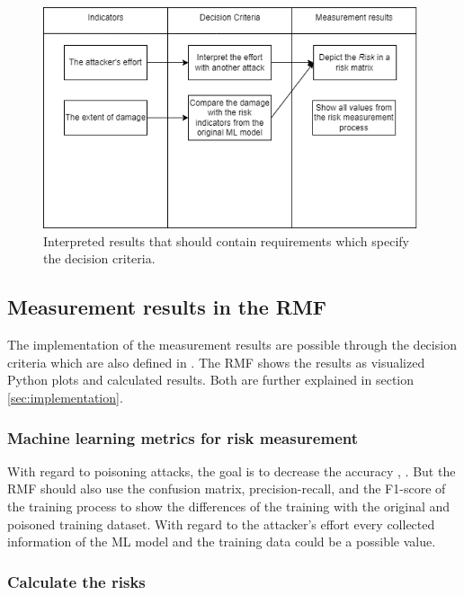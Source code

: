 \begin{figure}[ht!]
  \centering
  \includegraphics[width=11cm]{pictures/measurement_results_concept.png}
  \caption{Interpreted results that should contain requirements which specify the decision criteria.}
  \label{fig:measurement_results_concept}
\end{figure}

\subsection{Measurement results in the RMF}
\label{sec:measurement_results}

The implementation of the measurement results are possible through the decision criteria which are also defined in \cite{ISO_27004_2009}. The RMF shows the results as visualized Python plots and calculated results. Both are further explained in section \ref{sec:implementation}.

\subsubsection*{Machine learning metrics for risk measurement}

With regard to poisoning attacks, the goal is to decrease the accuracy \cite{DBLP:conf/icml/BiggioNL12}, \cite{DBLP:journals/corr/abs-1708-06733}. But the RMF should also use the confusion matrix, precision-recall, and the F1-score of the training process to show the differences of the training with the original and poisoned training dataset. With regard to the attacker's effort every collected information of the ML model and the training data could be a possible value.

\subsubsection*{Calculate the risks}

